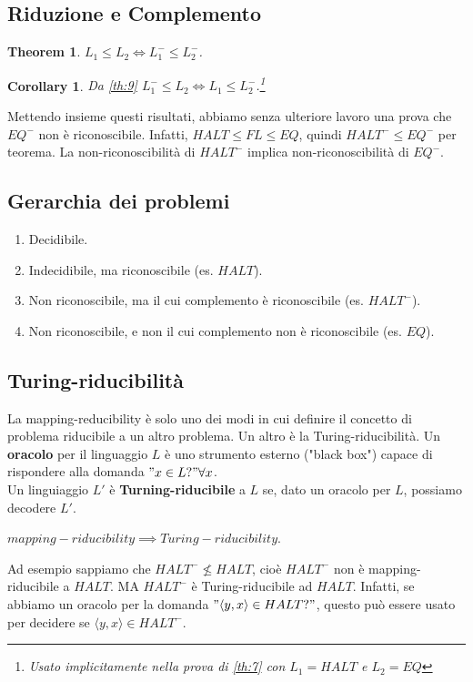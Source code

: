 \documentclass[a4paper, 12pt]{article}
\newtheorem{theorem}{Theorem}[section]
\newtheorem{corollary}{Corollary}[theorem]
\begin{document}
\subsection{Riduzione e Complemento}
\begin{theorem}
\label{th:10}
$L_1 \leq L_2 \iff L_{1}^{-} \leq L_{2}^{-}$.
\end{theorem}
\begin{corollary}
Da \ref{th:9} $L_{1}^{-} \leq L_2 \iff L_1 \leq L_{2}^{-}$.\footnote{Usato implicitamente nella prova di \ref{th:7} con $L_1 = HALT$ e $L_2= EQ$}
\end{corollary}
Mettendo insieme questi risultati, abbiamo senza ulteriore lavoro una prova che $EQ^{-}$ non \`e riconoscibile. Infatti, $HALT \leq FL \leq EQ$, quindi $HALT^{-} \leq EQ^{-}$ per teorema. La non-riconoscibilit\`a di $HALT^{-}$ implica non-riconoscibilit\`a di $EQ^{-}$.
\subsection{Gerarchia dei problemi}
\begin{enumerate}
\item Decidibile.
\item Indecidibile, ma riconoscibile (es. $HALT$).
\item Non riconoscibile, ma il cui complemento \`e riconoscibile (es. $HALT^{-}$).
\item Non riconoscibile, e non il cui complemento non \`e riconoscibile (es. $EQ$).
\end{enumerate}
\subsection{Turing-riducibilit\`a}
La mapping-reducibility è solo uno dei modi in cui definire il concetto di problema riducibile a un altro problema. Un altro \`e la Turing-riducibilit\`a. Un \textbf{oracolo} per il linguaggio $L$ \`e uno strumento esterno ("black box") capace di rispondere alla domanda $"x \in L?" \forall x$.\\ Un linguiaggio $L'$ \`e \textbf{Turning-riducibile} a $L$ se, dato un oracolo per $L$, possiamo decodere $L'$.
\begin{center}
$mapping-riducibility \implies Turing-riducibility$.
\end{center}
Ad esempio sappiamo che $HALT^{-} \nleq HALT$, cio\`e $HALT^{-}$ non \`e mapping-riducibile a $HALT$. MA $HALT^{-}$ \`e Turing-riducibile ad $HALT$. Infatti, se abbiamo un oracolo per la domanda $"\langle y,x \rangle \in HALT?"$, questo pu\`o essere usato per decidere se $\langle y,x \rangle \in HALT^{-}$.
\end{document}
